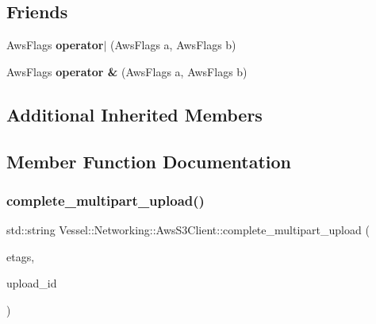 \subsection*{Friends}
\begin{DoxyCompactItemize}
\item 
\mbox{\label{class_vessel_1_1_networking_1_1_aws_s3_client_a65721bc87df7845108fc1d6bffee63f7}} 
Aws\+Flags {\bfseries operator$\vert$} (Aws\+Flags a, Aws\+Flags b)
\item 
\mbox{\label{class_vessel_1_1_networking_1_1_aws_s3_client_acf095f8ff202c0997eb2c85460498f56}} 
Aws\+Flags {\bfseries operator \&} (Aws\+Flags a, Aws\+Flags b)
\end{DoxyCompactItemize}
\subsection*{Additional Inherited Members}


\subsection{Member Function Documentation}
\mbox{\label{class_vessel_1_1_networking_1_1_aws_s3_client_add76f620364375f1a54730175e869de9}} 
\subsubsection{\texorpdfstring{complete\+\_\+multipart\+\_\+upload()}{complete\_multipart\_upload()}}
{\footnotesize\ttfamily std\+::string Vessel\+::\+Networking\+::\+Aws\+S3\+Client\+::complete\+\_\+multipart\+\_\+upload (\begin{DoxyParamCaption}\item[{const std\+::vector$<$ \hyperlink{struct_vessel_1_1_types_1_1_upload_tag_set}{Upload\+Tag\+Set} $>$ \&}]{etags,  }\item[{const std\+::string \&}]{upload\+\_\+id }\end{DoxyParamCaption})}



